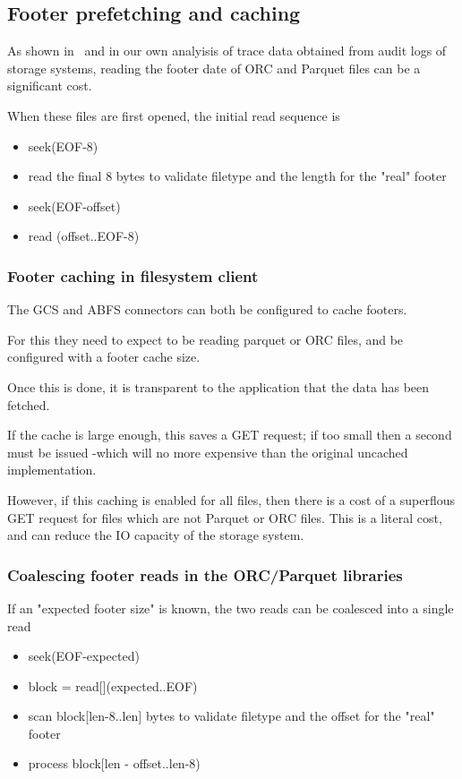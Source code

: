 \documentclass[manuscript]{acmart}
\begin{document}
\subsection{Footer prefetching and caching}\label{subsec:footer-prefetching-and-caching}

As shown in\ \cite{zeng2023empirical} and in our own analyisis of trace data
obtained from audit logs of storage systems, reading the footer date of ORC and Parquet
files can be a significant cost.

When these files are first opened, the initial read sequence is

\begin{itemize}
  \item{seek(EOF-8)}
  \item{read the final 8 bytes to validate filetype and the length for the "real" footer}
  \item{seek(EOF-offset)}
  \item{read (offset..EOF-8)}
\end{itemize}

\subsubsection{Footer caching in filesystem client}

The GCS and ABFS connectors can both be configured to cache footers.

For this they need to expect to be reading parquet or ORC files, and be configured
with a footer cache size.

Once this is done, it is transparent to the application that the data has been fetched.

If the cache is large enough, this saves a GET request; if too small then
a second must be issued -which will no more expensive than the original uncached
implementation.

However, if this caching is enabled for all files, then there is a cost
of a superflous GET request for files which are not Parquet or ORC files.
This is a literal cost, and can reduce the IO capacity of the storage system.

\subsubsection{Coalescing footer reads in the ORC/Parquet libraries}
If an "expected footer size" is known, the two reads can be coalesced into a single read

\begin{itemize}
  \item{seek(EOF-expected)}
  \item{block = read[](expected..EOF)}
  \item{scan block[len-8..len] bytes to validate filetype and the offset for the "real" footer}
  \item{process block[len - offset..len-8)}
\end{itemize}
\end{document}
